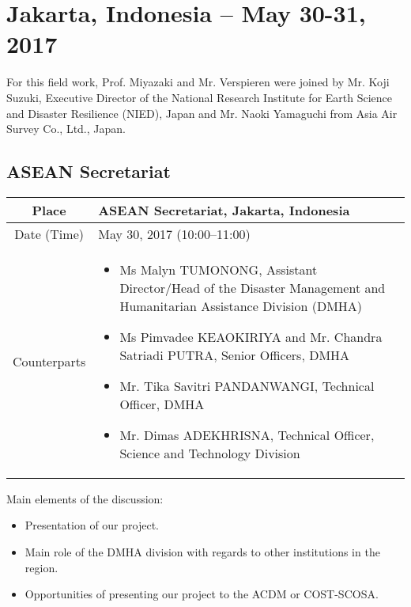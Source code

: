 \section{Jakarta, Indonesia -- May 30-31, 2017}

For this field work, Prof. Miyazaki and Mr. Verspieren were joined by Mr. Koji Suzuki, Executive Director of the National Research Institute for Earth Science and Disaster Resilience (NIED), Japan and Mr. Naoki Yamaguchi from Asia Air Survey Co., Ltd., Japan.

\subsection{ASEAN Secretariat}

\begin{table}[H]
   \centering
   \begin{tabular}{| c | p{12 cm} |}
   \hline
    Place & ASEAN Secretariat, Jakarta, Indonesia \\ \hline
    Date (Time) & May 30, 2017 (10:00--11:00) \\ \hline
    Counterparts & \begin{itemize} \item Ms Malyn TUMONONG, Assistant Director/Head of the Disaster Management and Humanitarian Assistance Division (DMHA) \item Ms Pimvadee KEAOKIRIYA and Mr. Chandra Satriadi PUTRA, Senior Officers, DMHA \item Mr. Tika Savitri PANDANWANGI, Technical Officer, DMHA \item Mr. Dimas ADEKHRISNA, Technical Officer, Science and Technology Division \end{itemize} \\ \hline   
   \end{tabular}
\end{table}

Main elements of the discussion:

\begin{itemize}

\item Presentation of our project.

\item Main role of the DMHA division with regards to other institutions in the region.

\item Opportunities of presenting our project to the ACDM or COST-SCOSA.

\end{itemize}


